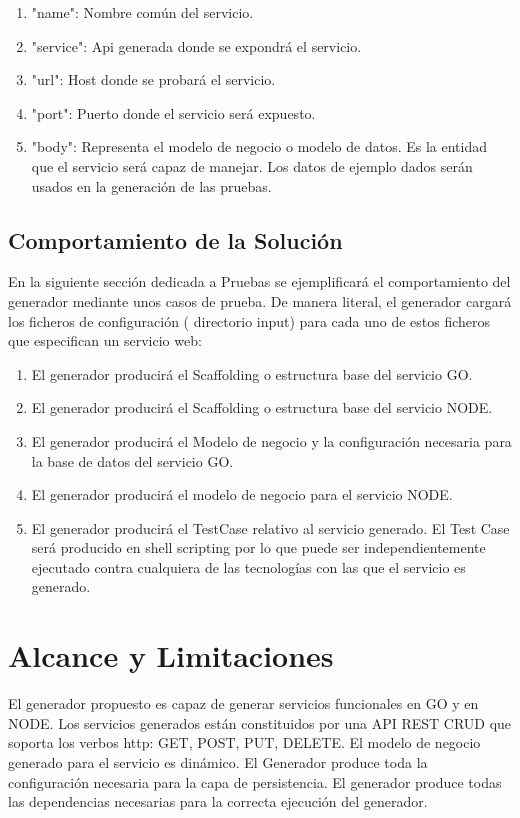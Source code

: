 \documentclass[a4paper,11pt]{book}
\begin{document}
\begin{enumerate}
\item "name": Nombre común del servicio.
\item "service": Api generada donde se expondrá el servicio.
\item "url":  Host donde se probará el servicio.
\item "port": Puerto donde el servicio será expuesto.
\item "body": Representa el modelo de negocio o modelo de datos. Es la entidad que el servicio será capaz de manejar.  Los datos de ejemplo dados serán usados en la generación de las pruebas. 
\end{enumerate}

\subsection{Comportamiento de la Solución}

En la siguiente sección dedicada a Pruebas se ejemplificará el comportamiento del generador mediante unos casos de prueba. De manera literal, el generador cargará los ficheros de configuración ( directorio input) para cada uno de estos ficheros que especifican un servicio web: 

\begin{enumerate}
\item El generador producirá el Scaffolding o estructura base del servicio GO.
\item El generador producirá el Scaffolding o estructura base del servicio NODE.
\item  El generador producirá el Modelo de negocio y la configuración necesaria para la base de datos del servicio GO.
\item El generador producirá el modelo de negocio para el servicio NODE.
\item El generador producirá el TestCase relativo al servicio generado. El Test Case será producido en shell scripting por lo que puede ser independientemente ejecutado contra cualquiera de las tecnologías con las que el servicio es generado.
\end{enumerate}

\section{Alcance y Limitaciones}

El generador propuesto es capaz de generar servicios funcionales en GO y en NODE. Los servicios generados están constituidos por una API REST CRUD que soporta los verbos http: GET, POST, PUT, DELETE.  El modelo de negocio generado para el servicio es dinámico. El Generador produce toda la configuración necesaria para la capa de persistencia. El generador produce todas las dependencias necesarias para la correcta ejecución del generador. 
\end{document}
